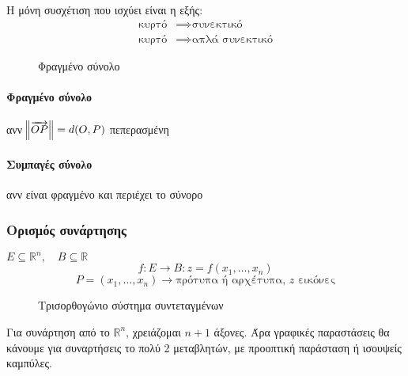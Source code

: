\documentclass[11pt,a4paper,titlepage,draft]{article}
\begin{document}
\paragraph{}
Η μόνη συσχέτιση που ισχύει είναι η εξής:
\begin{align*}
\text{κυρτό} &\implies \text{συνεκτικό} \\
\text{κυρτό} &\implies \text{απλά συνεκτικό}
\end{align*}

\begin{wrapfigure}{r}{0.3\textwidth}
\caption{Φραγμένο σύνολο}
\end{wrapfigure}

\paragraph{Φραγμένο σύνολο} ανν \(\norm{\overrightarrow{OP}} = d(O,P)\) πεπερασμένη
\paragraph{Συμπαγές σύνολο} ανν είναι φραγμένο και περιέχει το σύνορο

\subsubsection{Ορισμός συνάρτησης}

\(E \subseteq   \mathbb R^n, \quad B \subseteq  \mathbb R \)
\[f: E \rightarrow B: z = f(x_1, \dots, x_n) \]
\[P = \left( x_1, \dots, x_n \right) \rightarrow \text{πρότυπα ή αρχέτυπα, }z\text{ εικόνες} \]


\begin{wrapfigure}{r}{0.25\textwidth}
\centering
\caption{Τρισορθογώνιο σύστημα συντεταγμένων}
\end{wrapfigure}
Για συνάρτηση από το \( \mathbb R ^n\), χρειάζομαι \(n+1\) άξονες. Άρα γραφικές παραστάσεις θα κάνουμε για συναρτήσεις το πολύ 2 μεταβλητών, με προοπτική παράσταση ή ισουψείς καμπύλες.
\end{document}
